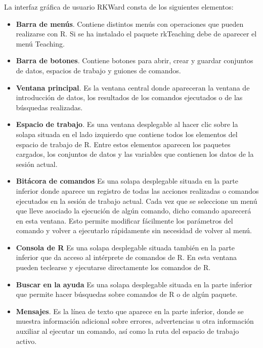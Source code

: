 La interfaz gráfica de usuario RKWard consta de los siguientes elementos:
\begin{itemize}
\item \textbf{Barra de menús}. Contiene distintos menús con operaciones que pueden realizarse con R. 
Si se ha instalado el paquete rkTeaching debe de aparecer el menú Teaching. 
\item \textbf{Barra de botones}. Contiene botones para abrir, crear y guardar conjuntos de datos, espacios de trabajo y guiones de comandos. 
\item \textbf{Ventana principal}. Es la ventana central donde apareceran la ventana de introducción de datos, los resultados de los comandos ejecutados o de las búsquedas realizadas. 
\item \textbf{Espacio de trabajo}. Es una ventana desplegable al hacer clic sobre la solapa situada en el lado izquierdo que contiene todos los elementos del espacio de trabajo de R.
Entre estos elementos aparecen los paquetes cargados, los conjuntos de datos y las variables que contienen los datos de la sesión actual. 
\item \textbf{Bitácora de comandos} Es una solapa desplegable situada en la parte inferior donde aparece un registro de todas las acciones realizadas o comandos ejecutados en la sesión de trabajo actual.
Cada vez que se seleccione un menú que lleve asociado la ejecución de algún comando, dicho comando aparecerá en esta
ventana. Esto permite modificar fácilmente los parámetros del comando y volver a ejecutarlo rápidamente sin necesidad
de volver al menú. 
\item \textbf{Consola de R} Es una solapa desplegable situada también en la parte inferior que da acceso al intérprete de comandos de R.
En esta ventana pueden teclearse y ejecutarse directamente los comandos de R.
\item \textbf{Buscar en la ayuda} Es una solapa desplegable situada en la parte inferior que permite hacer búsquedas sobre comandos de R o de algún paquete.
\item \textbf{Mensajes}. Es la línea de texto que aparece en la parte inferior, donde se muestra información adicional sobre errores, advertencias u
otra información auxiliar al ejecutar un comando, así como la ruta del espacio de trabajo activo.  
\end{itemize}

